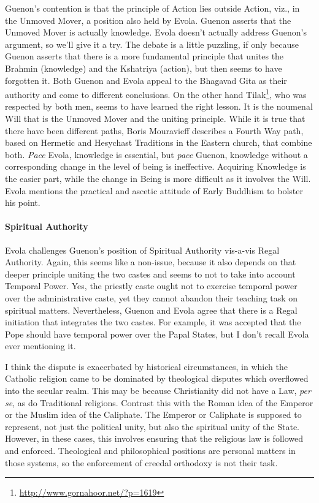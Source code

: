 Guenon's contention is that the principle of Action lies outside Action, viz., in the Unmoved Mover, a position also held by Evola. Guenon asserts that the Unmoved Mover is actually knowledge. Evola doesn't actually address Guenon's argument, so we'll give it a try. The debate is a little puzzling, if only because Guenon asserts that there is a more fundamental principle that unites the Brahmin (knowledge) and the Kshatriya (action), but then seems to have forgotten it. Both Guenon and Evola appeal to the Bhagavad Gita as their authority and come to different conclusions. On the other hand Tilak\footnote{\url{http://www.gornahoor.net/?p=1619}}, who was respected by both men, seems to have learned the right lesson. It is the noumenal Will that is the Unmoved Mover and the uniting principle. While it is true that there have been different paths, Boris Mouravieff describes a Fourth Way path, based on Hermetic and Hesychast Traditions in the Eastern church, that combine both. \emph{Pace} Evola, knowledge is essential, but \emph{pace} Guenon, knowledge without a corresponding change in the level of being is ineffective. Acquiring Knowledge is the easier part, while the change in Being is more difficult as it involves the Will. Evola mentions the practical and ascetic attitude of Early Buddhism to bolster his point.

\paragraph{Spiritual Authority}


Evola challenges Guenon's position of Spiritual Authority vis-a-vis Regal Authority. Again, this seems like a non-issue, because it also depends on that deeper principle uniting the two castes and seems to not to take into account Temporal Power. Yes, the priestly caste ought not to exercise temporal power over the administrative caste, yet they cannot abandon their teaching task on spiritual matters. Nevertheless, Guenon and Evola agree that there is a Regal initiation that integrates the two castes. For example, it was accepted that the Pope should have temporal power over the Papal States, but I don't recall Evola ever mentioning it.

I think the dispute is exacerbated by historical circumstances, in which the Catholic religion came to be dominated by theological disputes which overflowed into the secular realm. This may be because Christianity did not have a Law, \emph{per se}, as do Traditional religions. Contrast this with the Roman idea of the Emperor or the Muslim idea of the Caliphate. The Emperor or Caliphate is supposed to represent, not just the political unity, but also the spiritual unity of the State. However, in these cases, this involves ensuring that the religious law is followed and enforced. Theological and philosophical positions are personal matters in those systems, so the enforcement of creedal orthodoxy is not their task.

